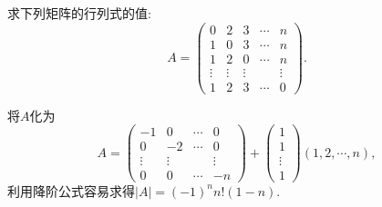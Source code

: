 \documentclass[../../main.tex]{subfiles}%
\begin{document}
\begin{example}
求下列矩阵的行列式的值:
\[
A = 
\begin{pmatrix}
0 & 2 & 3 & \cdots & n\\
1 & 0 & 3 & \cdots & n\\
1 & 2 & 0 & \cdots & n\\
\vdots & \vdots & \vdots & & \vdots\\
1 & 2 & 3 & \cdots & 0
\end{pmatrix}.
\]
\end{example}
\begin{solution}
将\(A\)化为
\[
A = 
\begin{pmatrix}
-1 & 0 & \cdots & 0\\
0 & -2 & \cdots & 0\\
\vdots & \vdots & & \vdots\\
0 & 0 & \cdots & -n
\end{pmatrix}
+
\begin{pmatrix}
1\\
1\\
\vdots\\
1
\end{pmatrix}
(1,2,\cdots,n),
\]
利用降阶公式容易求得\(|A| = (-1)^nn!(1 - n)\).
\end{solution}
\end{document}
